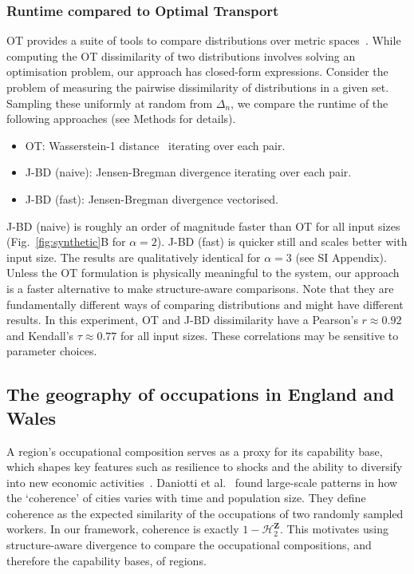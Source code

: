 \documentclass[aps,pre,floats,floatfix,superscriptaddress,twocolumn,final,10pt]{revtex4-2}
\theoremstyle{definition}
\renewcommand{\vec}[1]{\mathbf{#1}}
\newcommand{\entropyname}[2]{\mathcal{H}^{#1}_{#2}}
\begin{document}
\subsubsection{Runtime compared to Optimal Transport}

OT provides a suite of tools to compare distributions over metric spaces~\cite{Villani2009}. While computing the OT dissimilarity of two distributions involves solving an optimisation problem, our approach has closed-form expressions. Consider the problem of measuring the pairwise dissimilarity of distributions in a given set. Sampling these uniformly at random from $\Delta_n$, we compare the runtime of the following approaches (see Methods for details).
\begin{itemize}[noitemsep,topsep=0pt]
    \item {\small OT}: Wasserstein-1 distance~\cite{Kantorovich1939,Vaserten1969} iterating over each pair.
    \item {\small J-BD (naive)}: Jensen-Bregman divergence iterating over each pair.
    \item {\small J-BD (fast)}: Jensen-Bregman divergence vectorised.
\end{itemize}
{\small J-BD (naive)} is roughly an order of magnitude faster than {\small OT} for all input sizes (Fig.~\ref{fig:synthetic}B for $\alpha=2$). {\small J-BD (fast)} is quicker still and scales better with input size. The results are qualitatively identical for $\alpha=3$ (see SI Appendix). Unless the OT formulation is physically meaningful to the system, our approach is a faster alternative to make structure-aware comparisons. Note that they are fundamentally different ways of comparing distributions and might have different results. In this experiment, {\small OT} and {\small J-BD} dissimilarity have a Pearson's $r \approx 0.92$ and Kendall's $\tau\approx 0.77$ for all input sizes. These correlations may be sensitive to parameter choices.

\subsection{The geography of occupations in England and Wales}
A region's occupational composition serves as a proxy for its capability base, which shapes key features such as resilience to shocks and the ability to diversify into new economic activities~\cite{Neffke2011}. Daniotti et al.~\cite{Daniotti2025} found large-scale patterns in how the `coherence' of cities varies with time and population size. They define coherence as the expected similarity of the occupations of two randomly sampled workers. In our framework, coherence is exactly $1-\entropyname{\vec{Z}}{2}$. This motivates using structure-aware divergence to compare the occupational compositions, and therefore the capability bases, of regions.
\end{document}
